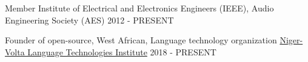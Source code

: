 

\begin{cventries}
	
  \cventry
    {Member} %
    {Institute of Electrical and Electronics Engineers (IEEE), Audio Engineering Society (AES)} %
    {} %
    {2012 - PRESENT} %
    {}

  \cventry
    {Founder of open-source, West African, Language technology organization} %
    {\href{https://github.com/Niger-Volta-LTI}{Niger-Volta Language Technologies Institute}} %
    {} %
    {2018 - PRESENT} %
    {}
	
\end{cventries}
